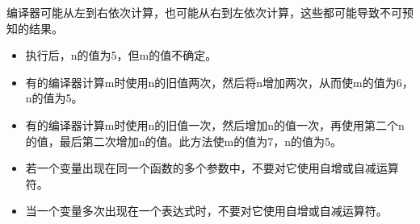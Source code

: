 \begin{frame}[fragile]
  
\end{frame}

\begin{frame}[fragile]
\tf 编译器可能从左到右依次计算，也可能从右到左依次计算，这些都可能导致不可预知的结果。
\end{frame}

\begin{frame}[fragile]

\end{frame}

\begin{frame}[fragile]
\begin{itemize}
\item\tf 执行后，n的值为5，但m的值不确定。\\[0.1in]
\item 有的编译器计算m时使用n的旧值两次，然后将n增加两次，从而使m的值为6，n的值为5。\\[0.1in]
\item 有的编译器计算m时使用n的旧值一次，然后增加n的值一次，再使用第二个n的值，最后第二次增加n的值。此方法使m的值为7，n的值为5。
\end{itemize}
\end{frame}

\begin{frame}[fragile]
\begin{itemize}
\item 若一个变量出现在同一个函数的多个参数中，不要对它使用自增或自减运算符。\\[0.1in]
\item 当一个变量多次出现在一个表达式时，不要对它使用自增或自减运算符。\end{itemize}
\end{frame}
